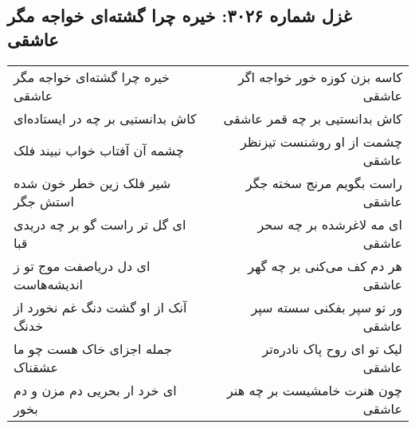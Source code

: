 \begin{center}
\section*{غزل شماره ۳۰۲۶: خیره چرا گشته‌ای خواجه مگر عاشقی}
\label{sec:3026}
\begin{longtable}{l p{0.5cm} r}
خیره چرا گشته‌ای خواجه مگر عاشقی
&&
کاسه بزن کوزه خور خواجه اگر عاشقی
\\
کاش بدانستیی بر چه در ایستاده‌ای
&&
کاش بدانستیی بر چه قمر عاشقی
\\
چشمه آن آفتاب خواب نبیند فلک
&&
چشمت از او روشنست تیزنظر عاشقی
\\
شیر فلک زین خطر خون شده استش جگر
&&
راست بگویم مرنج سخته جگر عاشقی
\\
ای گل تر راست گو بر چه دریدی قبا
&&
ای مه لاغرشده بر چه سحر عاشقی
\\
ای دل دریاصفت موج تو ز اندیشه‌هاست
&&
هر دم کف می‌کنی بر چه گهر عاشقی
\\
آنک از او گشت دنگ غم نخورد از خدنگ
&&
ور تو سپر بفکنی سسته سپر عاشقی
\\
جمله اجزای خاک هست چو ما عشقناک
&&
لیک تو ای روح پاک نادره‌تر عاشقی
\\
ای خرد ار بحریی دم مزن و دم بخور
&&
چون هنرت خامشیست بر چه هنر عاشقی
\\
\end{longtable}
\end{center}
